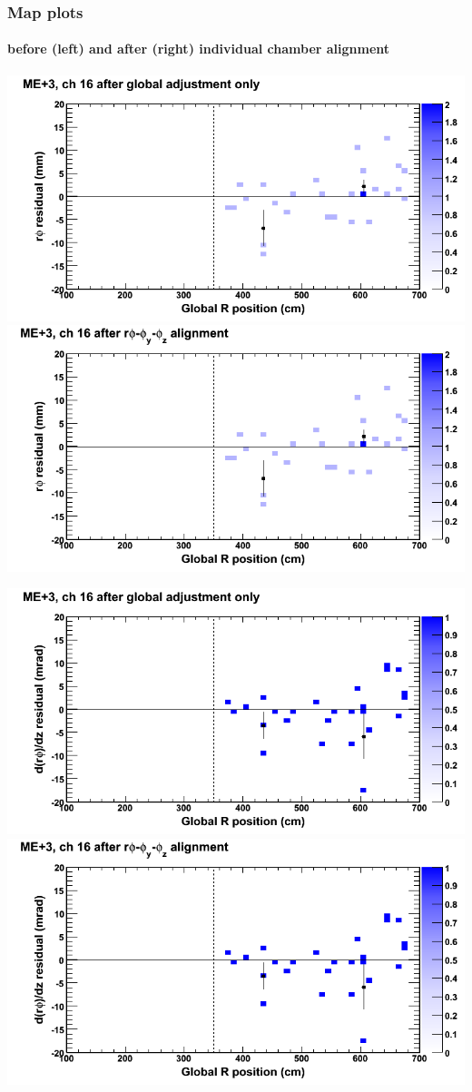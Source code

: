 \documentclass[compress]{beamer}
\begin{document}
\begin{frame}
\frametitle{Map plots}
\framesubtitle{before (left) and after (right) individual chamber alignment}
\includegraphics[width=0.5\linewidth]{ringmapplots_3dof/before_CSCvsr_mep3ch16_x.png} \includegraphics[width=0.5\linewidth]{ringmapplots_3dof/after_CSCvsr_mep3ch16_x.png}

\includegraphics[width=0.5\linewidth]{ringmapplots_3dof/before_CSCvsr_mep3ch16_dxdz.png} \includegraphics[width=0.5\linewidth]{ringmapplots_3dof/after_CSCvsr_mep3ch16_dxdz.png}
\end{frame}
\end{document}
